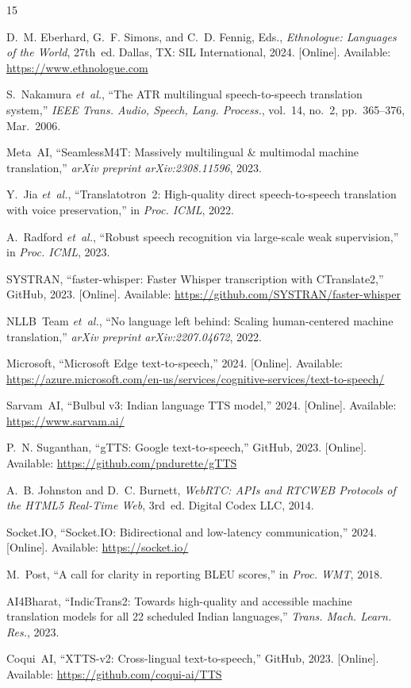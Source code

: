 \documentclass[conference]{IEEEtran}
\begin{document}
\begin{thebibliography}{15}

D.~M. Eberhard, G.~F. Simons, and C.~D. Fennig, Eds., \emph{Ethnologue: Languages of the World}, 27th~ed. Dallas, TX: SIL International, 2024. [Online]. Available: \url{https://www.ethnologue.com}

S.~Nakamura \emph{et~al.}, ``The ATR multilingual speech-to-speech translation system,'' \emph{IEEE Trans. Audio, Speech, Lang. Process.}, vol.~14, no.~2, pp.~365--376, Mar.~2006.

Meta~AI, ``SeamlessM4T: Massively multilingual \& multimodal machine translation,'' \emph{arXiv preprint arXiv:2308.11596}, 2023.

Y.~Jia \emph{et~al.}, ``Translatotron~2: High-quality direct speech-to-speech translation with voice preservation,'' in \emph{Proc. ICML}, 2022.

A.~Radford \emph{et~al.}, ``Robust speech recognition via large-scale weak supervision,'' in \emph{Proc. ICML}, 2023.

SYSTRAN, ``faster-whisper: Faster Whisper transcription with CTranslate2,'' GitHub, 2023. [Online]. Available: \url{https://github.com/SYSTRAN/faster-whisper}

NLLB~Team \emph{et~al.}, ``No language left behind: Scaling human-centered machine translation,'' \emph{arXiv preprint arXiv:2207.04672}, 2022.

Microsoft, ``Microsoft Edge text-to-speech,'' 2024. [Online]. Available: \url{https://azure.microsoft.com/en-us/services/cognitive-services/text-to-speech/}

Sarvam~AI, ``Bulbul v3: Indian language TTS model,'' 2024. [Online]. Available: \url{https://www.sarvam.ai/}

P.~N. Suganthan, ``gTTS: Google text-to-speech,'' GitHub, 2023. [Online]. Available: \url{https://github.com/pndurette/gTTS}

A.~B. Johnston and D.~C. Burnett, \emph{WebRTC: APIs and RTCWEB Protocols of the HTML5 Real-Time Web}, 3rd~ed. Digital Codex LLC, 2014.

Socket.IO, ``Socket.IO: Bidirectional and low-latency communication,'' 2024. [Online]. Available: \url{https://socket.io/}

M.~Post, ``A call for clarity in reporting BLEU scores,'' in \emph{Proc. WMT}, 2018.

AI4Bharat, ``IndicTrans2: Towards high-quality and accessible machine translation models for all 22 scheduled Indian languages,'' \emph{Trans. Mach. Learn. Res.}, 2023.

Coqui~AI, ``XTTS-v2: Cross-lingual text-to-speech,'' GitHub, 2023. [Online]. Available: \url{https://github.com/coqui-ai/TTS}

\end{thebibliography}
\end{document}
